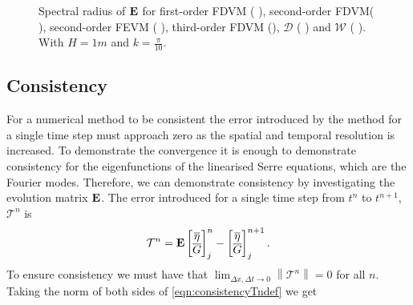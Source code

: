 \begin{figure}
\begin{subfigure}{0.5\textwidth}
	\end{subfigure}
	\caption{Spectral radius of $\mathbf{E}$ for first-order FDVM ({\color{green!60!black} \solidrule}), second-order FDVM({\color{red} \solidrule}), second-order FEVM ({\color{blue} \solidrule}), third-order FDVM ({\solidrule}), $\mathcal{D}$ ({\color{violet!80!white} \solidrule}) and $\mathcal{W}$ ({\color{orange} \solidrule}). With $H = 1m$ and $k = \frac{\pi}{10}$.}
	\label{fig:StabShall}
\end{figure}




\subsection{Consistency}
For a numerical method to be consistent the error introduced by the method for a single time step must approach zero as the spatial and temporal resolution is increased. To demonstrate the convergence it is enough to demonstrate consistency for the eigenfunctions of the linearised Serre equations, which are the Fourier modes. Therefore, we can demonstrate consistency by investigating the evolution matrix $\mathbf{E}$. The error introduced for a single time step from $t^n$ to $t^{n+1}$, $\mathcal{T}^n$ is
\begin{equation}
\mathcal{T}^n =  \mathbf{E}\begin{bmatrix}
\overline{\eta} \\ \overline{G}
\end{bmatrix}^{n}_j -  \begin{bmatrix}
\overline{\eta} \\ \overline{G}
\end{bmatrix}^{n+1}_j.
\label{eqn:consistencyTndef}
\end{equation}
To ensure consistency we must have that $ \lim_{\Delta x,\Delta t \rightarrow 0}\left \| \mathcal{T}^n \right \| = 0 $ for all $n$. Taking the norm of both sides of \eqref{eqn:consistencyTndef} we get

